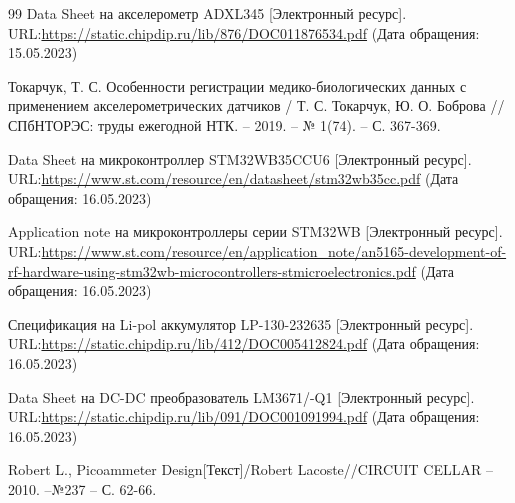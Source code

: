 \newpage
\renewcommand\refname{\centering СПИСОК ИСПОЛЬЗОВАННЫХ ИСТОЧНИКОВ}
\begin {thebibliography} {99}
Data Sheet на акселерометр ADXL345  [Электронный ресурс]. URL:\href{https://static.chipdip.ru/lib/876/DOC011876534.pdf}{https://static.chipdip.ru/lib/876/DOC011876534.pdf} (Дата обращения: 15.05.2023)

Токарчук, Т. С. Особенности регистрации медико-биологических данных с применением акселерометрических датчиков / Т. С. Токарчук, Ю. О. Боброва // СПбНТОРЭС: труды ежегодной НТК. – 2019. – № 1(74). – С. 367-369. 

Data Sheet на микроконтроллер STM32WB35CCU6  [Электронный ресурс]. URL:\href{https://www.st.com/resource/en/datasheet/stm32wb35cc.pdf}{https://www.st.com/resource/en/datasheet/stm32wb35cc.pdf} (Дата обращения: 16.05.2023)


Application note на микроконтроллеры серии STM32WB  [Электронный ресурс]. URL:\href{https://www.st.com/resource/en/application_note/an5165-development-of-rf-hardware-using-stm32wb-microcontrollers-stmicroelectronics.pdf}{https://www.st.com/resource/en/application\_note/an5165-development-of-rf-hardware-using-stm32wb-microcontrollers-stmicroelectronics.pdf} (Дата обращения: 16.05.2023)


Спецификация на Li-pol аккумулятор LP-130-232635  [Электронный ресурс]. URL:\href{https://static.chipdip.ru/lib/412/DOC005412824.pdf}{https://static.chipdip.ru/lib/412/DOC005412824.pdf} (Дата обращения: 16.05.2023)

Data Sheet на DC-DC преобразователь LM3671/-Q1  [Электронный ресурс]. URL:\href{https://static.chipdip.ru/lib/091/DOC001091994.pdf}{https://static.chipdip.ru/lib/091/DOC001091994.pdf} (Дата обращения: 16.05.2023)


Robert L., Picoammeter Design[Текст]/Robert Lacoste//CIRCUIT CELLAR --2010. --№237 -- С. 62-66.





\end {thebibliography}



